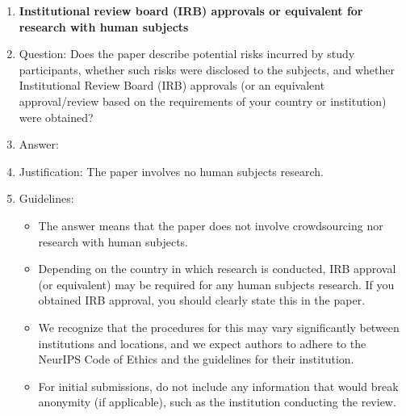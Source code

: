 \begin{enumerate}
\item {\bf Institutional review board (IRB) approvals or equivalent for research with human subjects}
    \item[] Question: Does the paper describe potential risks incurred by study participants, whether such risks were disclosed to the subjects, and whether Institutional Review Board (IRB) approvals (or an equivalent approval/review based on the requirements of your country or institution) were obtained?
    \item[] Answer: \answerNA{}
    \item[] Justification: The paper involves no human subjects research.
    \item[] Guidelines:
    \begin{itemize}
        \item The answer \answerNA{} means that the paper does not involve crowdsourcing nor research with human subjects.
        \item Depending on the country in which research is conducted, IRB approval (or equivalent) may be required for any human subjects research. If you obtained IRB approval, you should clearly state this in the paper. 
        \item We recognize that the procedures for this may vary significantly between institutions and locations, and we expect authors to adhere to the NeurIPS Code of Ethics and the guidelines for their institution. 
        \item For initial submissions, do not include any information that would break anonymity (if applicable), such as the institution conducting the review.
    \end{itemize}


\end{enumerate}
